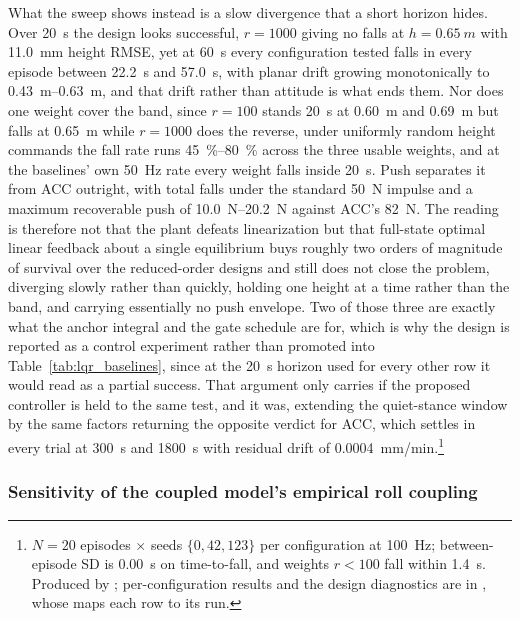 \documentclass[a4paper,fleqn]{cas-dc}
\begin{document}
What the sweep shows instead is a slow divergence that a short horizon hides.
Over \SI{20}{s} the design looks successful, $r{=}1000$ giving no falls at
$h{=}\SI{0.65}{m}$ with \SI{11.0}{mm} height RMSE, yet at \SI{60}{s} every
configuration tested falls in every episode between \SI{22.2}{s} and
\SI{57.0}{s}, with planar drift growing monotonically to
\SIrange{0.43}{0.63}{m}, and that drift rather than attitude is what ends them.
Nor does one weight cover the band, since $r{=}100$ stands \SI{20}{s} at
\SI{0.60}{m} and \SI{0.69}{m} but falls at \SI{0.65}{m} while $r{=}1000$ does the
reverse, under uniformly random height commands the fall rate runs
\SIrange{45}{80}{\percent} across the three usable weights, and at the baselines'
own \SI{50}{Hz} rate every weight falls inside \SI{20}{s}. Push separates it from
ACC outright, with total falls under the standard \SI{50}{N} impulse and a
maximum recoverable push of \SIrange{10.0}{20.2}{N} against ACC's \SI{82}{N}. The
reading is therefore not that the plant defeats linearization but that full-state
optimal linear feedback about a single equilibrium buys roughly two orders of
magnitude of survival over the reduced-order designs and still does not close the
problem, diverging slowly rather than quickly, holding one height at a time
rather than the band, and carrying essentially no push envelope. Two of those
three are exactly what the anchor integral and the gate schedule are for, which
is why the design is reported as a control experiment rather than promoted into
Table~\ref{tab:lqr_baselines}, since at the \SI{20}{s} horizon used for every
other row it would read as a partial success. That argument only carries if the
proposed controller is held to the same test, and it was, extending the
quiet-stance window by the same factors returning the opposite verdict for ACC,
which settles in every trial at \SI{300}{s} and \SI{1800}{s} with residual drift
of \SI{0.0004}{mm/min}.\footnote{$N{=}20$ episodes $\times$ seeds $\{0,42,123\}$ per configuration at \SI{100}{Hz}; between-episode SD is \SI{0.00}{s} on time-to-fall, and weights $r{<}100$ fall within \SI{1.4}{s}. Produced by ; per-configuration results and the design diagnostics are in , whose  maps each row to its run.}

\subsubsection{Sensitivity of the coupled model's empirical roll coupling}
\label{sec:b_roll_hip}
\end{document}
